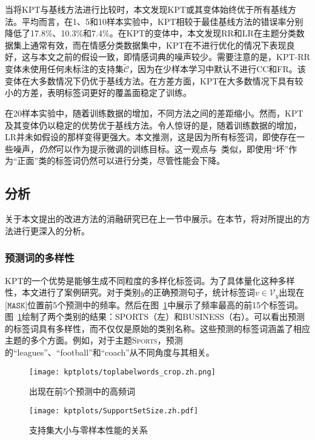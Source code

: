 当将KPT与基线方法进行比较时，本文发现KPT或其变体始终优于所有基线方法。平均而言，在1、5和10样本实验中，KPT相较于最佳基线方法的错误率分别降低了17.8\%、10.3\%和7.4\%。在KPT的变体中，本文发现RR和LR在主题分类数据集上通常有效，而在情感分类数据集中，KPT在不进行优化的情况下表现良好，这与本文之前的假设一致，即情感词典的噪声较少。需要注意的是，KPT-RR变体未使用任何未标注的支持集$\tilde{\mathcal{C}}$，因为在少样本学习中默认不进行CC和FR。该变体在大多数情况下仍优于基线方法。在方差方面，KPT在大多数情况下具有较小的方差，表明标签词更好的覆盖面稳定了训练。

在20样本实验中，随着训练数据的增加，不同方法之间的差距缩小。然而，KPT及其变体仍以稳定的优势优于基线方法。令人惊讶的是，随着训练数据的增加，LR并未如假设的那样变得更强大。本文推测，这是因为所有标签词，即使存在一些噪声，\emph{仍然}可以作为提示微调的训练目标。这一观点与~\citet{gao2020making}类似，即使用“坏”作为“正面”类的标签词仍然可以进行分类，尽管性能会下降。


\subsection{分析}
\label{sec:analysis}
关于本文提出的改进方法的消融研究已在上一节中展示。在本节，将对所提出的方法进行更深入的分析。


\subsubsection{预测词的多样性}

KPT的一个优势是能够生成不同粒度的多样化标签词。为了具体量化这种多样性，本文进行了案例研究。对于类别$y$的正确预测句子，统计标签词$v\in \mathcal{V}_y$出现在$\texttt{[MASK]}$位置前5个预测中的频率。然后在图~\ref{fig:violin}中展示了频率最高的前15个标签词。
图~\ref{fig:violin}绘制了两个类别的结果：\textsc{SPORTS}（左）和\textsc{BUSINESS}（右）。可以看出预测的标签词具有多样性，而不仅仅是原始的类别名称。这些预测的标签词涵盖了相应主题的多个方面。例如，对于主题\textsc{Sports}，预测的“leagues”、“football”和“coach”从不同角度与其相关。

\begin{figure}[H]
    \centering
    \texttt{[image: kptplots/toplabelwords\_crop.zh.png]}
    \caption{出现在前5个预测中的高频词}
    \label{fig:violin}
\end{figure}


\label{app:analysis}
\begin{figure}
    \centering
    \texttt{[image: kptplots/SupportSetSize.zh.pdf]}
    \caption{支持集大小与零样本性能的关系}
    \label{fig:calistudy}
\end{figure}

